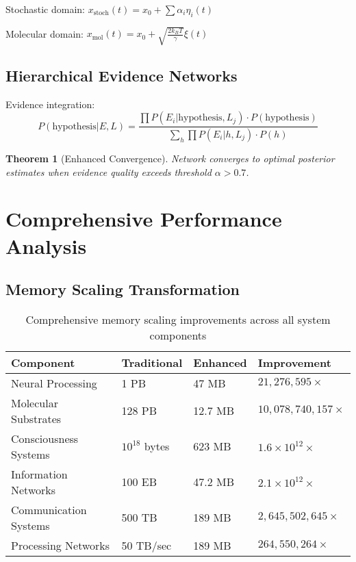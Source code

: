 \documentclass[12pt,a4paper]{article}
\newtheorem{theorem}{Theorem}[section]
\begin{document}
Stochastic domain: $x_{\text{stoch}}(t) = x_0 + \sum \alpha_i \eta_i(t)$

Molecular domain: $x_{\text{mol}}(t) = x_0 + \sqrt{\frac{2k_B T}{\gamma}} \xi(t)$

\subsection{Hierarchical Evidence Networks}

Evidence integration:
\begin{equation}
P(\text{hypothesis} | E, L) = \frac{\prod P(E_i | \text{hypothesis}, L_j) \cdot P(\text{hypothesis})}{\sum_h \prod P(E_i | h, L_j) \cdot P(h)}
\end{equation}

\begin{theorem}[Enhanced Convergence]
Network converges to optimal posterior estimates when evidence quality exceeds threshold $\alpha > 0.7$.
\end{theorem}

\section{Comprehensive Performance Analysis}

\subsection{Memory Scaling Transformation}

\begin{table}[H]
\centering
\begin{tabular}{|p{3cm}|p{3cm}|p{3cm}|p{4cm}|}
\hline
\textbf{Component} & \textbf{Traditional} & \textbf{Enhanced} & \textbf{Improvement} \\
\hline
Neural Processing & 1 PB & 47 MB & $21,276,595\times$ \\
\hline
Molecular Substrates & 128 PB & 12.7 MB & $10,078,740,157\times$ \\
\hline
Consciousness Systems & $10^{18}$ bytes & 623 MB & $1.6 \times 10^{12}\times$ \\
\hline
Information Networks & 100 EB & 47.2 MB & $2.1 \times 10^{12}\times$ \\
\hline
Communication Systems & 500 TB & 189 MB & $2,645,502,645\times$ \\
\hline
Processing Networks & 50 TB/sec & 189 MB & $264,550,264\times$ \\
\hline
\end{tabular}
\caption{Comprehensive memory scaling improvements across all system components}
\end{table}
\end{document}
